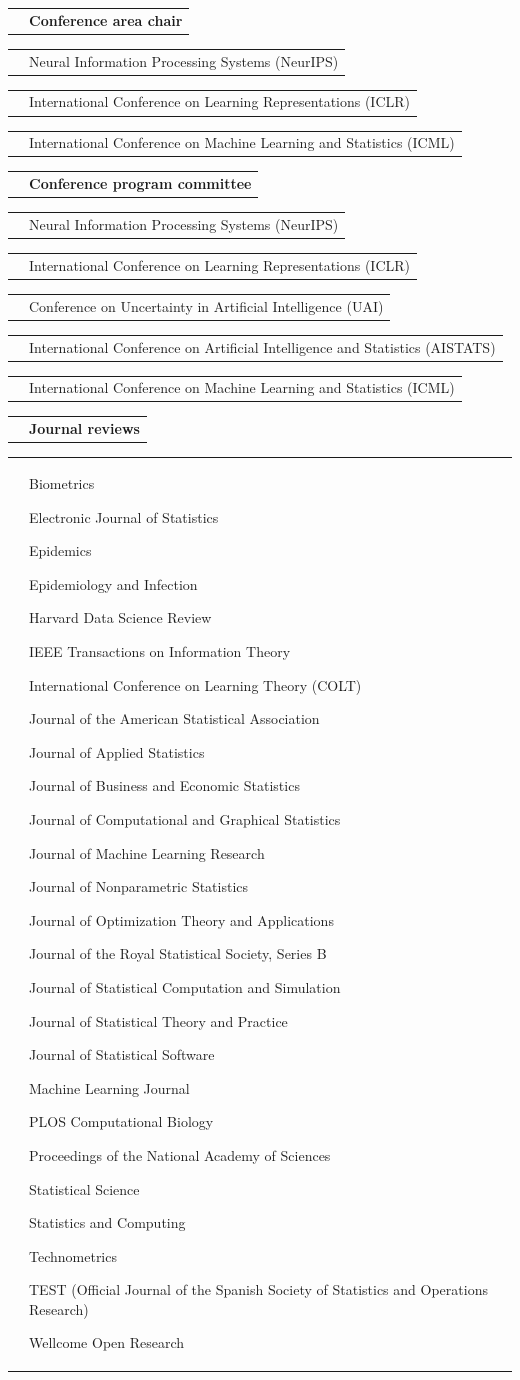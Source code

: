 \documentclass[11pt,letterpaper]{minimal/moderncv}
\makeatletter
\newcommand{\bolditem}[1]{\cvitem{}{\textbf{#1}}}
\renewcommand*{\cvitem}[2]{%
  \begin{tabular}{@{}p{\hintscolumnwidth}@{\hspace{\separatorcolumnwidth}}%
    p{\maincolumnwidth}@{}}%
    \raggedleft {#1} &  {#2}%
  \end{tabular}%
}
\makeatother
\begin{document}
\vspace{6pt}
\bolditem{Conference area chair}
\cvitem{}{Neural Information Processing Systems (NeurIPS)}
\cvitem{}{International Conference on Learning Representations (ICLR)}
\cvitem{}{International Conference on Machine Learning and Statistics (ICML)}

\vspace{6pt}
\bolditem{Conference program committee}
\cvitem{}{Neural Information Processing Systems (NeurIPS)}
\cvitem{}{International Conference on Learning Representations (ICLR)}
\cvitem{}{Conference on Uncertainty in Artificial Intelligence (UAI)}
\cvitem{}{International Conference on Artificial Intelligence and Statistics (AISTATS)}
\cvitem{}{International Conference on Machine Learning and Statistics (ICML)}

\vspace{6pt}
\bolditem{Journal reviews}
\cvitem{}{\begin{itemize*}[label=\raisebox{0.4ex}{\tiny$\bullet$}]
\item[] \hspace{-.8ex}Biometrics
\item Electronic Journal of Statistics
\item Epidemics
\item Epidemiology and Infection 
\item Harvard Data Science Review
\item IEEE Transactions on Information Theory
\item International Conference on Learning Theory (COLT)
\item Journal of the American Statistical Association
\item Journal of Applied Statistics
\item Journal of Business and Economic Statistics
\item Journal of Computational and Graphical Statistics
\item Journal of Machine Learning Research
\item Journal of Nonparametric Statistics
\item Journal of Optimization Theory and Applications
\item Journal of the Royal Statistical Society, Series B
\item Journal of Statistical Computation and Simulation
\item Journal of Statistical Theory and Practice
\item Journal of Statistical Software
\item Machine Learning Journal
\item PLOS Computational Biology
\item Proceedings of the National Academy of Sciences
\item Statistical Science
\item Statistics and Computing
\item Technometrics
\item TEST (Official Journal of the Spanish Society of Statistics and Operations Research)
\item Wellcome Open Research
\end{itemize*}}
\end{document}
